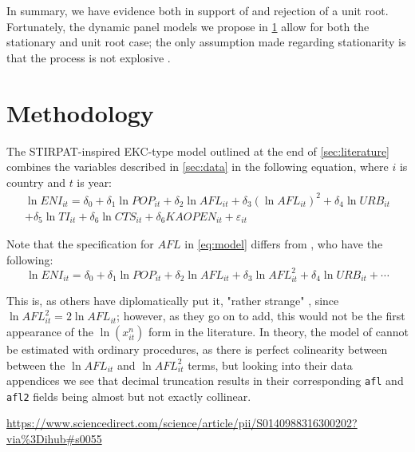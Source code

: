 \documentclass[12pt,a4paper]{article}
\begin{document}
In summary, we have evidence both in support of and rejection of a unit root.
Fortunately, the dynamic panel models we propose in \cref{sec:methodology} allow for both the stationary and unit root case; the only assumption made regarding stationarity is that the process is not explosive \cite[p.5, A.2.1]{fritschGMMEstimationLinear2019}.

\clearpage
\section{Methodology}\label{sec:methodology}


The STIRPAT-inspired EKC-type model outlined at the end of \cref{sec:literature} combines the variables described in \cref{sec:data} in the following equation, where $i$ is country and $t$ is year:
\begin{multline}\label{eq:model}
\ln ENI_{it} = \delta_0 + \delta_1 \ln POP_{it} + \delta_2 \ln AFL_{it} + \delta_3 \left( \ln AFL_{it} \right)^2 + \delta_4 \ln URB_{it} \\ + \delta_5 \ln TI_{it} + \delta_6 \ln CTS_{it} + \delta_6 KAOPEN_{it} + \varepsilon_{it}
\end{multline}

Note that the specification for $AFL$ in \cref{eq:model} differs from \cite[Equation 4]{rafiqUrbanizationOpennessEmissions2016}, who have the following:
\begin{equation*}\label{eq:rafiqmodel}
\ln ENI_{it} = \delta_0 + \delta_1 \ln POP_{it} + \delta_2 \ln AFL_{it} + \delta_3 \ln AFL_{it}^2 + \delta_4 \ln URB_{it} + \cdots
\end{equation*}

This is, as others have diplomatically put it, "rather strange" \cite[p.4936]{moosaEconometricsEnvironmentalKuznets2017}, since $\ln AFL_{it}^2 = 2 \ln AFL_{it}$; however, as they go on to add, this would not be the first appearance of the $\ln \left( x^n_{it} \right)$ form in the literature.
In theory, the model of \cite{rafiqUrbanizationOpennessEmissions2016} cannot be estimated with ordinary procedures, as there is perfect colinearity between between the $\ln AFL_{it}$ and $\ln AFL_{it}^2$ terms, but looking into their data appendices\footnotemark{} we see that decimal truncation results in their corresponding \texttt{afl} and \texttt{afl2} fields being almost but not exactly collinear.

\urldef{\rafiqdata}\url{https://www.sciencedirect.com/science/article/pii/S0140988316300202?via%3Dihub#s0055}
\end{document}
